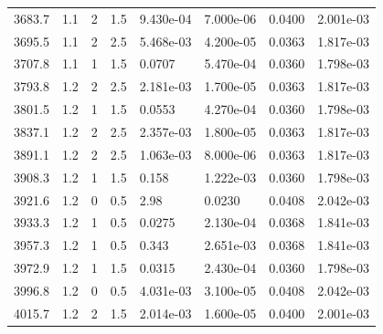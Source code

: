 \documentclass[preview]{standalone}
\begin{document}
{{{\begin{tabular}{L{1.2cm}C{1.2cm} C{0.3cm}C{0.5cm} C{1.4cm}C{1.4cm} C{1.4cm}C{1.4cm}}
  3683.7  &   1.1  & 2     & 1.5 &  9.430e-04  & 7.000e-06  & 0.0400 &  2.001e-03   \\ 
  3695.5  &   1.1  & 2     & 2.5 &  5.468e-03  & 4.200e-05  & 0.0363 &  1.817e-03   \\ 
  3707.8  &   1.1  & 1     & 1.5 &  0.0707  & 5.470e-04  & 0.0360 &  1.798e-03   \\ 
  3793.8  &   1.2  & 2     & 2.5 &  2.181e-03  & 1.700e-05  & 0.0363 &  1.817e-03   \\ 
  3801.5  &   1.2  & 1     & 1.5 &  0.0553  & 4.270e-04  & 0.0360 &  1.798e-03   \\ 
  3837.1  &   1.2  & 2     & 2.5 &  2.357e-03  & 1.800e-05  & 0.0363 &  1.817e-03   \\ 
  3891.1  &   1.2  & 2     & 2.5 &  1.063e-03  & 8.000e-06  & 0.0363 &  1.817e-03   \\ 
  3908.3  &   1.2  & 1     & 1.5 &  0.158  & 1.222e-03  & 0.0360 &  1.798e-03   \\ 
  3921.6  &   1.2  & 0     & 0.5 &  2.98  & 0.0230  & 0.0408 &  2.042e-03   \\ 
  3933.3  &   1.2  & 1     & 0.5 &  0.0275  & 2.130e-04  & 0.0368 &  1.841e-03   \\ 
  3957.3  &   1.2  & 1     & 0.5 &  0.343  & 2.651e-03  & 0.0368 &  1.841e-03   \\ 
  3972.9  &   1.2  & 1     & 1.5 &  0.0315  & 2.430e-04  & 0.0360 &  1.798e-03   \\ 
  3996.8  &   1.2  & 0     & 0.5 &  4.031e-03  & 3.100e-05  & 0.0408 &  2.042e-03   \\ 
  4015.7  &   1.2  & 2     & 1.5 &  2.014e-03  & 1.600e-05  & 0.0400 &  2.001e-03   \\ 
\hline 
\end{tabular} 

}}}
\end{document}
